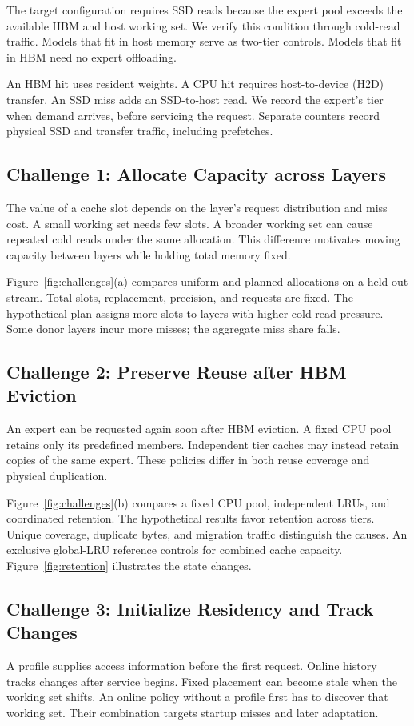 \documentclass[conference,9pt,letterpaper]{IEEEtran}
\begin{document}
The target configuration requires SSD reads because the expert pool exceeds the available HBM and host working set. We verify this condition through cold-read traffic. Models that fit in host memory serve as two-tier controls. Models that fit in HBM need no expert offloading.

An HBM hit uses resident weights. A CPU hit requires host-to-device (H2D) transfer. An SSD miss adds an SSD-to-host read. We record the expert's tier when demand arrives, before servicing the request. Separate counters record physical SSD and transfer traffic, including prefetches.

\subsection{Challenge 1: Allocate Capacity across Layers}
The value of a cache slot depends on the layer's request distribution and miss cost. A small working set needs few slots. A broader working set can cause repeated cold reads under the same allocation. This difference motivates moving capacity between layers while holding total memory fixed.

Figure~\ref{fig:challenges}(a) compares uniform and planned allocations on a held-out stream. Total slots, replacement, precision, and requests are fixed. The hypothetical plan assigns more slots to layers with higher cold-read pressure. Some donor layers incur more misses; the aggregate miss share falls.

\subsection{Challenge 2: Preserve Reuse after HBM Eviction}
An expert can be requested again soon after HBM eviction. A fixed CPU pool retains only its predefined members. Independent tier caches may instead retain copies of the same expert. These policies differ in both reuse coverage and physical duplication.

Figure~\ref{fig:challenges}(b) compares a fixed CPU pool, independent LRUs, and coordinated retention. The hypothetical results favor retention across tiers. Unique coverage, duplicate bytes, and migration traffic distinguish the causes. An exclusive global-LRU reference controls for combined cache capacity. Figure~\ref{fig:retention} illustrates the state changes.

\subsection{Challenge 3: Initialize Residency and Track Changes}
A profile supplies access information before the first request. Online history tracks changes after service begins. Fixed placement can become stale when the working set shifts. An online policy without a profile first has to discover that working set. Their combination targets startup misses and later adaptation.
\end{document}

